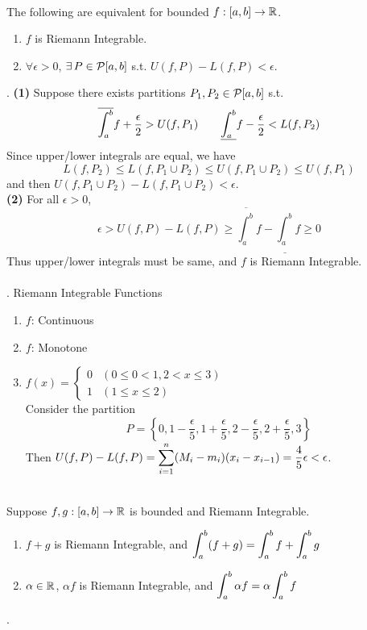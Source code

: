 \\
 The following are equivalent for bounded $f:[a, b]\rightarrow\mathbb{R}$.
\begin{enumerate}
	\item $f$ is Riemann Integrable.
	\item $\forall \epsilon>0$, $\exists \, P \in \mathcal{P}[a, b]$ s.t. $U(f, P) - L(f, P) < \epsilon$.
\end{enumerate}
\pf. \textbf{(1)} Suppose there exists partitions $P_1, P_2\in \mathcal{P}[a, b]$ s.t. $$\displaystyle \overline{\int_a^b}f+ \frac{\epsilon}{2} > U(f, P_1)\qquad \underline{\int_a^b}f - \frac{\epsilon}{2} < L(f, P_2)$$
Since upper/lower integrals are equal, we have
$$L(f, P_2) \leq L(f, P_1\cup P_2) \leq U(f, P_1\cup P_2)\leq U(f, P_1)$$
and then $U(f, P_1\cup P_2) - L(f, P_1\cup P_2) < \epsilon$.\\
\textbf{(2)} For all $\epsilon > 0$, $$\epsilon > U(f, P) - L(f, P) \geq \overline{\int_a^b}f - \underline{\int_a^b}f \geq 0$$
Thus upper/lower integrals must be same, and $f$ is Riemann Integrable.\\
\\
\ex. Riemann Integrable Functions
\begin{enumerate}
	\item $f$: Continuous
	\item $f$: Monotone
	\item $f(x) = \begin{cases}
		0 & (0\leq 0 < 1, 2 < x \leq 3)\\ 1 & (1\leq x\leq 2)
	\end{cases}$\\
	Consider the partition $$P = \left\{0, 1-\frac{\epsilon}{5}, 1 + \frac{\epsilon}{5}, 2 - \frac{\epsilon}{5}, 2 + \frac{\epsilon}{5}, 3\right\}$$
	Then $U(f, P) - L(f, P) = \displaystyle \sum_{i=1}^n (M_i-m_i)(x_i - x_{i-1}) = \frac{4}{5}\epsilon < \epsilon$.
\end{enumerate}~\\
 Suppose $f, g:[a, b]\rightarrow\mathbb{R}$ is bounded and Riemann Integrable.
\begin{enumerate}
	\item $f+g$ is Riemann Integrable, and $\displaystyle \int_a^b (f+g) = \int_a^b f + \int_a^b g$
	\item $\alpha\in \mathbb{R}$, $\alpha f$ is Riemann Integrable, and $\displaystyle \int_a^b \alpha f = \alpha \int_a^b f$
\end{enumerate}
\pf.
